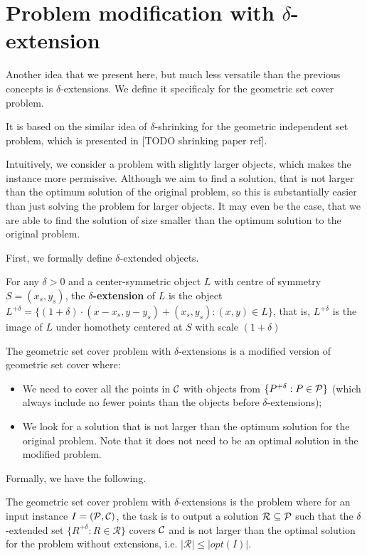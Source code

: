 \section{Problem modification with $\delta$-extension}

Another idea that we present here, but much less versatile
than the previous concepts is $\delta$-extensions.
We define it specificaly for the geometric set cover problem.

It is based on the similar idea of $\delta$-shrinking
for the geometric independent set problem,
which is presented in [TODO shrinking paper ref].

Intuitively, we consider a problem with slightly larger objects,
which makes the instance more permissive.
Although we aim to find a solution,
that is not larger than the
optimum solution of the original problem,
so this is substantially easier than just
solving the problem for larger objects.
It may even be the case,
that we are able to find the solution
of size smaller than the optimum solution
to the original problem.

First, we formally define $\delta$-extended objects.

\begin{defi}
For any $\delta > 0$ and a center-symmetric object $L$ with
centre of symmetry $S = (x_s, y_s)$,
the \textbf{$\delta$-extension} of $L$ is the object $L^{+\delta} =
\{(1 + \delta)\cdot(x - x_s, y - y_s) + (x_s, y_s) : (x, y) \in L\}$,
that is, $L^{+\delta}$ is the image of $L$ under homothety centered
at $S$ with scale $(1+\delta)$
\end{defi}


The geometric set cover problem with $\delta$-extensions
is a modified version of geometric set cover where:
\begin{itemize}
\item We need to cover all the points in $\mathcal{C}$
with objects from $\{P^{+\delta} : P \in \mathcal{P}\}$ (which always 
include no fewer points than the objects
before $\delta$-extensions);
\item We look for a solution that is not larger than the optimum solution
for the original problem.
Note that it does not need to be an optimal solution in
the modified problem.
\end{itemize}

Formally, we have the following.

\begin{defi}
The geometric set cover problem
with $\delta$-extensions is the problem where for an input instance
$I=(\mathcal{P}, \mathcal{C})$,
the task is to output a solution $\mathcal{R} \subseteq \mathcal{P}$
such that the $\delta$-extended set
$\{ R^{+\delta} :  R \in \mathcal{R} \}$ covers $\mathcal{C}$
and is not larger than the optimal solution for the problem without
extensions, i.e. $|\mathcal{R}| \le |opt(I)|$.
\end{defi}

